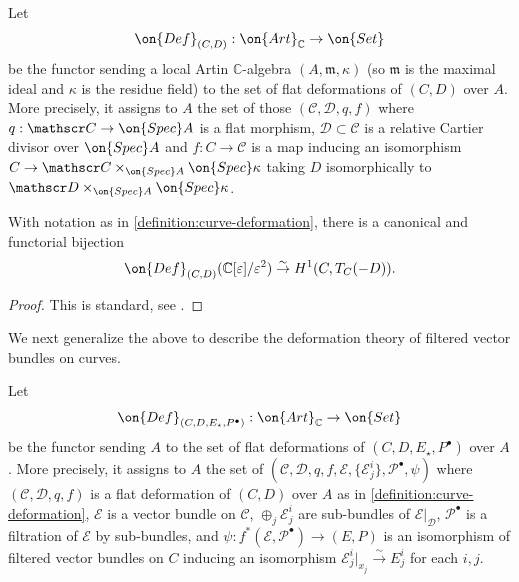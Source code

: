 \begin{definition}
\notready
	\label{definition:curve-deformation}
	Let $$\on{Def}_{(C,D)}: \on{Art}_{\mathbb{C}}\to
\on{Set}$$ be the functor sending a local Artin $\mathbb{C}$-algebra
$(A,\mathfrak m, \kappa)$ (so $\mathfrak m$ is the maximal ideal and $\kappa$ is
the residue field) to the
set of flat deformations of $(C,D)$ over $A$.
More precisely, it assigns to $A$ the set of those
$(\mathscr C, \mathscr D, q, f)$ where
$q: \mathscr C \to \on{Spec} A$ is a flat morphism, $\mathscr D \subset \mathscr C$
is a relative Cartier divisor over $\on{Spec} A$ and $f: C \to \mathscr C$ is a map
inducing an isomorphism $C \to \mathscr C \times_{\on{Spec} A} \on{Spec} \kappa$
taking $D$ isomorphically to $\mathscr D \times_{\on{Spec} A} \on{Spec} \kappa$.
\end{definition}
\begin{proposition}
\notready\label{proposition:curve-deformation}
    With notation as in \autoref{definition:curve-deformation}, there is a
    canonical and functorial bijection
    $$\on{Def}_{(C,D)}(\mathbb{C}[\varepsilon]/\varepsilon^2)\overset{\sim}{\to} H^1(C, T_C(-D)).$$
\end{proposition}
\begin{proof}
This is standard, see
\cite[Proposition 3.4.17]{sernesi:deformations-of-algebraic-schemes}.
\end{proof}
We next generalize the above to describe the deformation theory of filtered
vector bundles on curves.
\begin{definition}
\notready
	\label{definition:}
	Let
$$\on{Def}_{(C,D, {E_\star}, P^\bullet)}:\on{Art}_{\mathbb{C}}\to \on{Set}$$ be the functor
sending $A$ to the set of flat deformations of $(C, D, E_\star, P^\bullet)$ over $A$.
More precisely, it assigns to $A$ the set of
$(\mathscr C, \mathscr D, q, f, \mathscr E, \{\mathscr E^i_j\}, \mathscr{P}^\bullet, \psi)$
where $(\mathscr C, \mathscr D, q, f)$ is a flat deformation of $(C,D)$ over $A$
as in \autoref{definition:curve-deformation}, $\mathscr E$ is a vector bundle on $\mathscr C$,
$\oplus_j\mathscr E^i_j$ are sub-bundles of $\mathscr{E}|_\mathscr D$,
$\mathscr{P}^\bullet$ is a filtration of $\mathscr{E}$ by sub-bundles,
and $\psi: f^* (\mathscr E,  \mathscr{P}^\bullet) \to (E,
 P)$ is an isomorphism of filtered vector bundles on $C$ inducing an isomorphism $\mathscr{E}^i_j|_{x_j}\overset{\sim}{\to} E^i_j$ for each $i,j$.
\end{definition}
